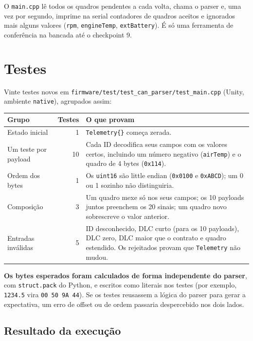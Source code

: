 \documentclass[11pt,a4paper]{article}
\begin{document}
O \texttt{main.cpp} lê todos os quadros pendentes a cada volta, chama o parser e, uma vez por segundo, imprime na serial contadores de quadros aceitos e ignorados mais alguns valores (\texttt{rpm}, \texttt{engineTemp}, \texttt{extBattery}). É só uma ferramenta de conferência na bancada até o checkpoint 9.

\section{Testes}

Vinte testes novos em \texttt{firmware/test/test\_can\_parser/test\_main.cpp} (Unity, ambiente \texttt{native}), agrupados assim:

\begin{center}
\begin{tabularx}{\textwidth}{lrX}
\toprule
\textbf{Grupo} & \textbf{Testes} & \textbf{O que provam} \\
\midrule
Estado inicial & 1 & \texttt{Telemetry\{\}} começa zerada. \\
Um teste por payload & 10 & Cada ID decodifica seus campos com os valores certos, incluindo um número negativo (\texttt{airTemp}) e o quadro de 4 bytes (\texttt{0x114}). \\
Ordem dos bytes & 1 & Os \texttt{uint16} são little endian (\texttt{0x0100} e \texttt{0xABCD}); um 0 ou 1 sozinho não distinguiria. \\
Composição & 3 & Um quadro mexe só nos seus campos; os 10 payloads juntos preenchem os 20 sinais; um quadro novo sobrescreve o valor anterior. \\
Entradas inválidas & 5 & ID desconhecido, DLC curto (para os 10 payloads), DLC zero, DLC maior que o contrato e quadro estendido. Os rejeitados provam que \texttt{Telemetry} não mudou. \\
\bottomrule
\end{tabularx}
\end{center}

\textbf{Os bytes esperados foram calculados de forma independente do parser}, com \texttt{struct.pack} do Python, e escritos como literais nos testes (por exemplo, \texttt{1234.5} vira \texttt{00 50 9A 44}). Se os testes reusassem a lógica do parser para gerar a expectativa, um erro de offset ou de ordem passaria despercebido nos dois lados.

\subsection{Resultado da execução}
\end{document}
